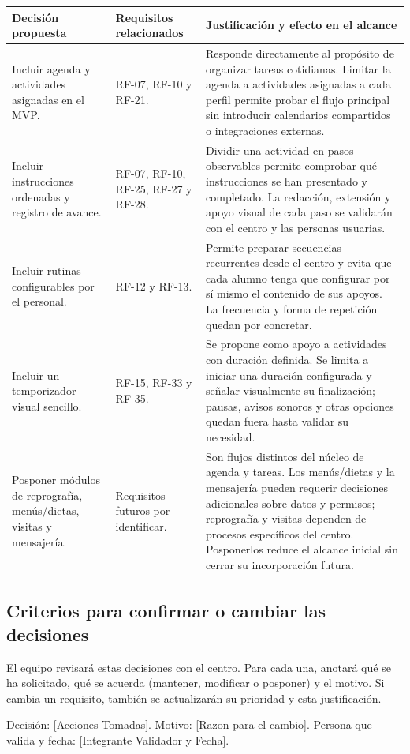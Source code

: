 \begin{center}
\small
\begin{tabularx}{\textwidth}{|>{\raggedright\arraybackslash}p{2.8cm}|>{\raggedright\arraybackslash}p{2.7cm}|>{\raggedright\arraybackslash}X|}
\hline
\rowcolor{tableHeader}
Decisión propuesta & Requisitos relacionados & Justificación y efecto en el alcance \\
\hline
Incluir agenda y actividades asignadas en el MVP. & RF-07, RF-10 y RF-21. & Responde directamente al propósito de organizar tareas cotidianas. Limitar la agenda a actividades asignadas a cada perfil permite probar el flujo principal sin introducir calendarios compartidos o integraciones externas. \\
\hline
Incluir instrucciones ordenadas y registro de avance. & RF-07, RF-10, RF-25, RF-27 y RF-28. & Dividir una actividad en pasos observables permite comprobar qué instrucciones se han presentado y completado. La redacción, extensión y apoyo visual de cada paso se validarán con el centro y las personas usuarias. \\
\hline
Incluir rutinas configurables por el personal. & RF-12 y RF-13. & Permite preparar secuencias recurrentes desde el centro y evita que cada alumno tenga que configurar por sí mismo el contenido de sus apoyos. La frecuencia y forma de repetición quedan por concretar. \\
\hline
Incluir un temporizador visual sencillo. & RF-15, RF-33 y RF-35. & Se propone como apoyo a actividades con duración definida. Se limita a iniciar una duración configurada y señalar visualmente su finalización; pausas, avisos sonoros y otras opciones quedan fuera hasta validar su necesidad. \\
\hline
Posponer módulos de reprografía, menús/dietas, visitas y mensajería. & Requisitos futuros por identificar. & Son flujos distintos del núcleo de agenda y tareas. Los menús/dietas y la mensajería pueden requerir decisiones adicionales sobre datos y permisos; reprografía y visitas dependen de procesos específicos del centro. Posponerlos reduce el alcance inicial sin cerrar su incorporación futura. \\
\hline
\end{tabularx}
\end{center}

\subsection{Criterios para confirmar o cambiar las decisiones}
El equipo revisará estas decisiones con el centro. Para cada una, anotará qué se ha solicitado, qué se acuerda (mantener, modificar o posponer) y el motivo. Si cambia un requisito, también se actualizarán su prioridad y esta justificación.

\begin{infobox}[title={Formato de Solicitud}]
  Decisión: [Acciones Tomadas]. Motivo: [Razon para el cambio]. Persona que valida y fecha: [Integrante Validador y Fecha].
\end{infobox}